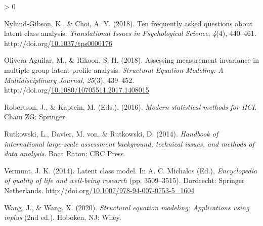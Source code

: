 \documentclass[12pt,a4paper,oneside]{reedthesis}
\newlength{\cslhangindent}
\newenvironment{CSLReferences}[2] %
 {%
  \setlength{\parindent}{0pt}
  \ifodd #1 \everypar{\setlength{\hangindent}{\cslhangindent}}\ignorespaces\fi
  \ifnum #2 > 0
  \setlength{\parskip}{#2\baselineskip}
  \fi
 }%
 {}
\begin{document}
\begin{CSLReferences}{1}{0}
\leavevmode\hypertarget{ref-nylund-gibson_ten_2018}{}%
Nylund-Gibson, K., \& Choi, A. Y. (2018). Ten frequently asked questions about latent class analysis. \emph{Translational Issues in Psychological Science}, \emph{4}(4), 440--461. http://doi.org/\href{https://doi.org/10.1037/tps0000176}{10.1037/tps0000176}

\leavevmode\hypertarget{ref-olivera-aguilar_assessing_2018}{}%
Olivera-Aguilar, M., \& Rikoon, S. H. (2018). Assessing measurement invariance in multiple-group latent profile analysis. \emph{Structural Equation Modeling: A Multidisciplinary Journal}, \emph{25}(3), 439--452. http://doi.org/\href{https://doi.org/10.1080/10705511.2017.1408015}{10.1080/10705511.2017.1408015}

\leavevmode\hypertarget{ref-robertson_modern_2016}{}%
Robertson, J., \& Kaptein, M. (Eds.). (2016). \emph{Modern statistical methods for {HCI}}. Cham {ZG}: Springer.

\leavevmode\hypertarget{ref-rutkowski_handbook_2014}{}%
Rutkowski, L., Davier, M. von, \& Rutkowski, D. (2014). \emph{Handbook of international large-scale assessment background, technical issues, and methods of data analysis}. Boca Raton: {CRC} Press.

\leavevmode\hypertarget{ref-michalos_latent_2014}{}%
Vermunt, J. K. (2014). Latent class model. In A. C. Michalos (Ed.), \emph{Encyclopedia of quality of life and well-being research} (pp. 3509--3515). Dordrecht: Springer Netherlands. http://doi.org/\href{https://doi.org/10.1007/978-94-007-0753-5_1604}{10.1007/978-94-007-0753-5\_1604}

\leavevmode\hypertarget{ref-wang_structural_2020}{}%
Wang, J., \& Wang, X. (2020). \emph{Structural equation modeling: Applications using mplus} (2nd ed.). Hoboken, {NJ}: Wiley.

\end{CSLReferences}

\end{document}
